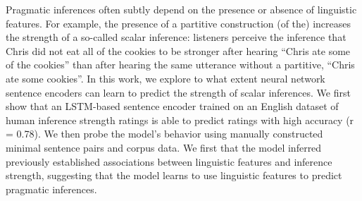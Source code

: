 Pragmatic inferences often subtly depend on the presence or absence of linguistic features. For example, the presence of a partitive construction (of the) increases the strength of a so-called scalar inference: listeners perceive the inference that Chris did not eat all of the cookies to be stronger after hearing ``Chris ate some of the cookies'' than after hearing the same utterance without a partitive, ``Chris ate some cookies''. In this work, we explore to what extent neural network sentence encoders can learn to predict the strength of scalar inferences. We first show that an LSTM-based sentence encoder trained on an English dataset of human inference strength ratings is able to predict ratings with high accuracy (r = 0.78). We then probe the model's behavior using manually constructed minimal sentence pairs and corpus data. We first that the model inferred previously established associations between linguistic features and inference strength, suggesting that the model learns to use linguistic features to predict pragmatic inferences.
